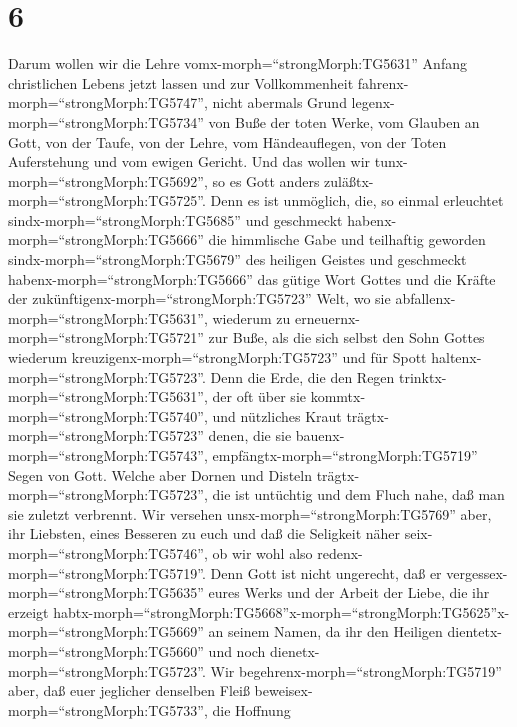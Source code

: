 \hypertarget{section-5}{%
\section{6}\label{section-5}}

 Darum wollen wir die Lehre
vomx-morph=``strongMorph:TG5631'' Anfang christlichen Lebens jetzt
lassen und zur Vollkommenheit fahrenx-morph=``strongMorph:TG5747'',
nicht abermals Grund legenx-morph=``strongMorph:TG5734'' von Buße der
toten Werke, vom Glauben an Gott,  von der Taufe, von der
Lehre, vom Händeauflegen, von der Toten Auferstehung und vom ewigen
Gericht.  Und das wollen wir
tunx-morph=``strongMorph:TG5692'', so es Gott anders
zuläßtx-morph=``strongMorph:TG5725''.  Denn es ist
unmöglich, die, so einmal erleuchtet sindx-morph=``strongMorph:TG5685''
und geschmeckt habenx-morph=``strongMorph:TG5666'' die himmlische Gabe
und teilhaftig geworden sindx-morph=``strongMorph:TG5679'' des heiligen
Geistes  und geschmeckt habenx-morph=``strongMorph:TG5666''
das gütige Wort Gottes und die Kräfte der
zukünftigenx-morph=``strongMorph:TG5723'' Welt,  wo sie
abfallenx-morph=``strongMorph:TG5631'', wiederum zu
erneuernx-morph=``strongMorph:TG5721'' zur Buße, als die sich selbst den
Sohn Gottes wiederum kreuzigenx-morph=``strongMorph:TG5723'' und für
Spott haltenx-morph=``strongMorph:TG5723''.  Denn die Erde,
die den Regen trinktx-morph=``strongMorph:TG5631'', der oft über sie
kommtx-morph=``strongMorph:TG5740'', und nützliches Kraut
trägtx-morph=``strongMorph:TG5723'' denen, die sie
bauenx-morph=``strongMorph:TG5743'',
empfängtx-morph=``strongMorph:TG5719'' Segen von Gott. 
Welche aber Dornen und Disteln trägtx-morph=``strongMorph:TG5723'', die
ist untüchtig und dem Fluch nahe, daß man sie zuletzt verbrennt.
 Wir versehen unsx-morph=``strongMorph:TG5769'' aber, ihr
Liebsten, eines Besseren zu euch und daß die Seligkeit näher
seix-morph=``strongMorph:TG5746'', ob wir wohl also
redenx-morph=``strongMorph:TG5719''.  Denn Gott ist nicht
ungerecht, daß er vergessex-morph=``strongMorph:TG5635'' eures Werks und
der Arbeit der Liebe, die ihr erzeigt
habtx-morph=``strongMorph:TG5668''\textbar x-morph=``strongMorph:TG5625''x-morph=``strongMorph:TG5669''
an seinem Namen, da ihr den Heiligen
dientetx-morph=``strongMorph:TG5660'' und noch
dienetx-morph=``strongMorph:TG5723''.  Wir
begehrenx-morph=``strongMorph:TG5719'' aber, daß euer jeglicher
denselben Fleiß beweisex-morph=``strongMorph:TG5733'', die Hoffnung
